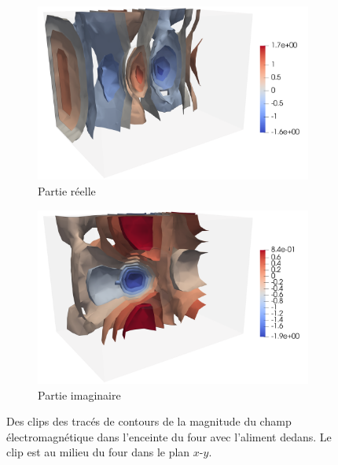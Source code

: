 \begin{figure}[H]
    \centering
    \begin{subfigure}{.5\textwidth}
        \centering
        \includegraphics[scale=0.15]{figures/helmholtz/helmholtz_reel_reflexion2.png}
        \caption{Partie réelle}
    \end{subfigure}%
    \begin{subfigure}{.5\textwidth}
        \centering
        \includegraphics[scale=0.15]{figures/helmholtz/helmholtz_imag_reflexion2.png}
        \caption{Partie imaginaire}
    \end{subfigure}
    \caption{Des clips des tracés de contours de la magnitude du champ
    électromagnétique dans l'enceinte du four avec l'aliment dedans.
    Le clip est au milieu du four dans le plan $x\text{-}y$.}
\end{figure}

